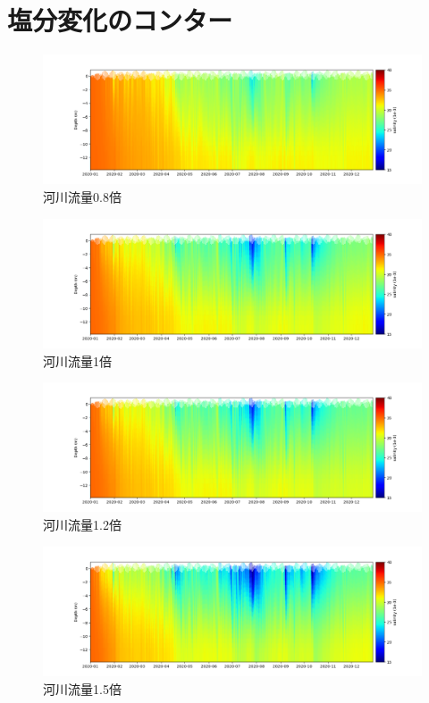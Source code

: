 \documentclass[12pt,a4paper]{jarticle}
\begin{document}
\section{塩分変化のコンター}
\begin{figure}[hbtp]
    \includegraphics[keepaspectratio,width=180mm]{contour/Tokyo3_chiba1buoy.png}
    \caption{河川流量0.8倍}
\end{figure}

\begin{figure}[hbtp]
    \centering
        \includegraphics[keepaspectratio,scale=0.5]{contour/Tokyo4_chiba1buoy.png}
    \caption{河川流量1倍}
\end{figure}

\begin{figure}[hbtp]
    \centering
        \includegraphics[keepaspectratio,scale=0.5]{contour/Tokyo5_chiba1buoy.png}
    \caption{河川流量1.2倍}
\end{figure}

\begin{figure}[hbtp]
    \centering
        \includegraphics[keepaspectratio,scale=0.5]{contour/Tokyo6_chiba1buoy.png}
    \caption{河川流量1.5倍}
\end{figure}
\end{document}
